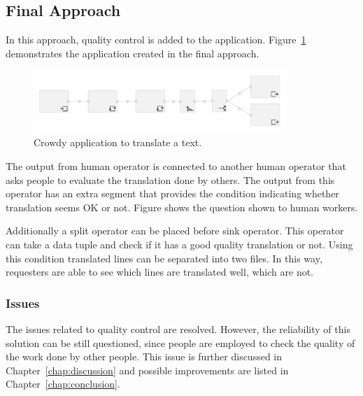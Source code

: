 \subsection{Final Approach}
In this approach, quality control is added to the application. Figure~\ref{fig:scenario2.2} demonstrates the application created in the final approach.

\begin{figure}[ht]
	\centering
	\includegraphics[width=0.85\textwidth]{figures/scenarios/scenario2_2.png}
	\caption{Crowdy application to translate a text.}
	\label{fig:scenario2.2}
\end{figure}

The output from human operator is connected to another human operator that asks people to evaluate the translation done by others. The output from this operator has an extra segment that provides the condition indicating whether translation seems OK or not. Figure shows the question shown to human workers.

Additionally a split operator can be placed before sink operator. This operator can take a data tuple and check if it has a good quality translation or not. Using this condition translated lines can be separated into two files. In this way, requesters are able to see which lines are translated well, which are not.

\subsubsection{Issues}
The issues related to quality control are resolved. However, the reliability of this solution can be still questioned, since people are employed to check the quality of the work done by other people. This issue is further discussed in Chapter~\ref{chap:discussion} and possible improvements are listed in Chapter~\ref{chap:conclusion}.